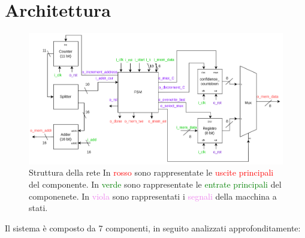 \documentclass[12pt,a4paper]{scrartcl}
\begin{document}
\section{Architettura}
\begin{figure}[htbp]
  \centering
  \includegraphics[width=1\linewidth]{schema.drawio2.png}
  \caption{ Struttura della rete
        \newline
        In \textcolor{red}{rosso} sono rappresentate le \textcolor{red}{uscite principali} del componente. \newline
        In \textcolor{green}{verde} sono rappresentate le \textcolor{green}{entrate principali} del componenete. \newline
        In \textcolor{violet}{viola} sono rappresentati i \textcolor{violet}{segnali} della macchina a stati.
    }
  \label{fig:componente}
\end{figure}
    Il sistema è composto da 7 componenti, in seguito analizzati approfonditamente:
\end{document}
